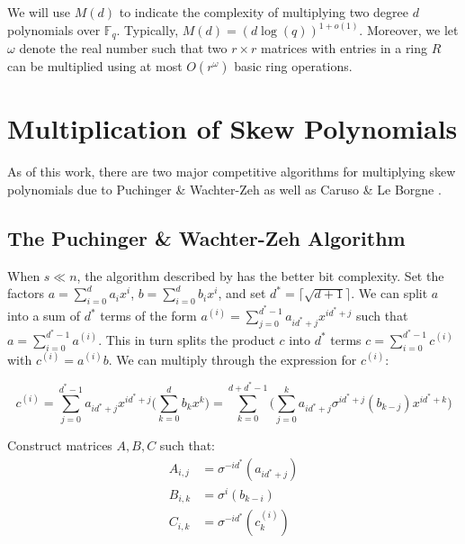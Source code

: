 \documentclass[9pt]{article}
\theoremstyle{plain}
\theoremstyle{definition}
\theoremstyle{remark}
\newcommand{\F}{\mathbb{F}}
\begin{document}
We will use $M(d)$ to indicate the complexity of multiplying two degree $d$ polynomials over $\F_q$. Typically, $M(d) = (d \log(q))^{1 + o(1)}$. Moreover, we let $\omega$ denote the real number such that two $r \times r$ matrices with entries in a ring $R$ can be multiplied using at most $O(r^{\omega})$ basic ring operations.

\section{Multiplication of Skew Polynomials}

As of this work, there are two major competitive algorithms for multiplying skew polynomials due to Puchinger \& Wachter-Zeh \cite{PUCHINGER2017b} as well as Caruso \& Le Borgne \cite{CaLe17}. 

\subsection{The Puchinger \& Wachter-Zeh Algorithm}

When $s \ll n$, the algorithm described by \cite[Th.7]{PUCHINGER2017b} has the better bit complexity. Set the factors $a = \sum_{i=0}^d a_i x^i$, $b = \sum_{i=0}^d b_i x^i $, and set $d^* = \lceil \sqrt{d + 1} \rceil $. We can split $a$ into a sum of $d^*$ terms of the form $a^{(i)} = \sum_{j=0}^{d^* - 1} a_{id^* + j}x^{id^* + j}$ such that $a = \sum_{i=0}^{d^* - 1} a^{(i)}$. This in turn splits the product $c$ into $d^*$ terms $c = \sum_{i=0}^{d^* - 1} c^{(i)}$ with $c^{(i)} = a^{(i)}b$. We can multiply through the expression for $c^{(i)}$:

\begin{equation*}
    c^{(i)} = \sum_{j=0}^{d^* - 1} a_{id^* + j}x^{id^* + j} \bigg( \sum_{k = 0}^{d} b_k x^k \bigg) = \sum_{k=0}^{d + d^* - 1} \bigg( \sum_{j=0}^{k} a_{id^* +j}\sigma^{id^* + j}(b_{k -j})x^{id^* + k} \bigg) 
\end{equation*}

Construct matrices $A, B, C$ such that:
\begin{align}\label{multmatr}
    A_{i,j} & = \sigma^{-id^*}(a_{id^* + j}) \\
     B_{i,k} & = \sigma^{i}(b_{k-i}) \\ \label{multmatr2}
    C_{i,k} & = \sigma^{-id^*}(c_k^{(i)})
\end{align}
\end{document}
